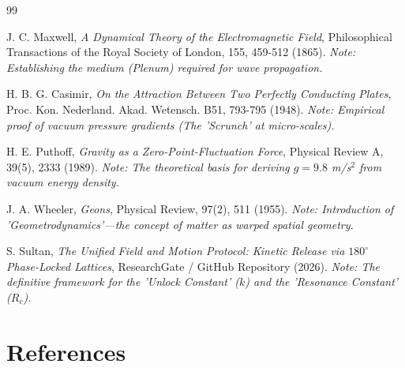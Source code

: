 \documentclass[11pt]{article}
\begin{document}
\begin{thebibliography}{99}

J. C. Maxwell, 
\textit{A Dynamical Theory of the Electromagnetic Field}, 
Philosophical Transactions of the Royal Society of London, 155, 459-512 (1865).
\textit{Note: Establishing the medium (Plenum) required for wave propagation.}

H. B. G. Casimir, 
\textit{On the Attraction Between Two Perfectly Conducting Plates}, 
Proc. Kon. Nederland. Akad. Wetensch. B51, 793-795 (1948).
\textit{Note: Empirical proof of vacuum pressure gradients (The 'Scrunch' at micro-scales).}

H. E. Puthoff, 
\textit{Gravity as a Zero-Point-Fluctuation Force}, 
Physical Review A, 39(5), 2333 (1989).
\textit{Note: The theoretical basis for deriving $g=9.8$ m/s$^2$ from vacuum energy density.}

J. A. Wheeler, 
\textit{Geons}, 
Physical Review, 97(2), 511 (1955).
\textit{Note: Introduction of 'Geometrodynamics'—the concept of matter as warped spatial geometry.}

S. Sultan, 
\textit{The Unified Field and Motion Protocol: Kinetic Release via $180^\circ$ Phase-Locked Lattices}, 
ResearchGate / GitHub Repository (2026).
\textit{Note: The definitive framework for the 'Unlock Constant' ($k$) and the 'Resonance Constant' ($R_c$).}

\end{thebibliography}

\section*{References}
\end{document}
